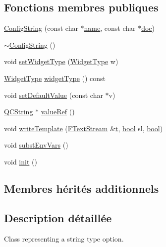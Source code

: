 \subsection*{Fonctions membres publiques}
\begin{DoxyCompactItemize}
\item 
\hyperlink{class_config_string_af35e791e48a93c96bdba2df9ca848f28}{Config\+String} (const char $\ast$\hyperlink{class_config_option_a2f226c32b0c447c1fa628660f42859c4}{name}, const char $\ast$\hyperlink{vhdljjparser_8cpp_a9910424bf5401d657c3b3fdff6fcc152}{doc})
\item 
\hyperlink{class_config_string_a562abfad9e8a9f7ecb1bcdac06150390}{$\sim$\+Config\+String} ()
\item 
void \hyperlink{class_config_string_a35abeb5e79ca5812affa17d5ff67f5ee}{set\+Widget\+Type} (\hyperlink{class_config_string_a6d65e61d6dcbd73f014d16ef4b7721d1}{Widget\+Type} w)
\item 
\hyperlink{class_config_string_a6d65e61d6dcbd73f014d16ef4b7721d1}{Widget\+Type} \hyperlink{class_config_string_a611a064b88440a10e0f63590430155ac}{widget\+Type} () const 
\item 
void \hyperlink{class_config_string_aabfc2165fcdafd51ec0668d3fe4f7b35}{set\+Default\+Value} (const char $\ast$v)
\item 
\hyperlink{class_q_c_string}{Q\+C\+String} $\ast$ \hyperlink{class_config_string_ab3a24655083aa0ed8fb54bab4e060a68}{value\+Ref} ()
\item 
void \hyperlink{class_config_string_a9ba817d1e46850c6000fe2dd6d03ff8e}{write\+Template} (\hyperlink{class_f_text_stream}{F\+Text\+Stream} \&\hyperlink{058__bracket__recursion_8tcl_a69e959f6901827e4d8271aeaa5fba0fc}{t}, \hyperlink{qglobal_8h_a1062901a7428fdd9c7f180f5e01ea056}{bool} sl, \hyperlink{qglobal_8h_a1062901a7428fdd9c7f180f5e01ea056}{bool})
\item 
void \hyperlink{class_config_string_a39a8a773cf8ef1c5b31fa1e02b49cb32}{subst\+Env\+Vars} ()
\item 
void \hyperlink{class_config_string_ace07ea2ad1492f238771682286a7b79e}{init} ()
\end{DoxyCompactItemize}
\subsection*{Membres hérités additionnels}


\subsection{Description détaillée}
Class representing a string type option. 


